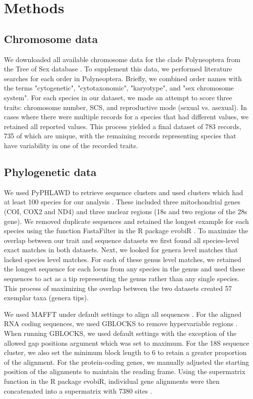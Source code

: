 \section{Methods}

\subsection{Chromosome data}
We downloaded all available chromosome data for the clade Polyneoptera from the Tree of Sex database \citep{blackmon2016,TOS2014}.
To supplement this data, we performed literature searches for each order in Polyneoptera.
Briefly, we combined order names with the terms "cytogenetic", "cytotaxonomic", "karyotype", and "sex chromosome system". %
For each species in our dataset, we made an attempt to score three traits: chromosome number, SCS, and reproductive mode (sexual vs. asexual).
In cases where there were multiple records for a species that had different values, we retained all reported values.
This process yielded a final dataset of 783 records, 735 of which are unique, with the remaining records representing species that have variability in one of the recorded traits. 

\subsection{Phylogenetic data}
We used PyPHLAWD to retrieve sequence clusters and used clusters which had at least 100 species for our analysis \citep{smith2018phyphlawd}. 
These included three mitochondrial genes (COI, COX2 and ND4) and three nuclear regions (18s and two regions of the 28s gene). 
We removed duplicate sequences and retained the longest example for each species using the function FastaFilter in the R package evobiR \citep{blackmon2015evobir}.
To maximize the overlap between our trait and sequence datasets we first found all species-level exact matches in both datasets.
Next, we looked for genera level matches that lacked species level matches.
For each of these genus level matches, we retained the longest sequence for each locus from any species in the genus and used these sequences to act as a tip representing the genus rather than any single species. 
This process of maximizing the overlap between the two datasets created 57 exemplar taxa (genera tips).

We used MAFFT under default settings to align all sequences \citep{katoh2013mafft}.
For the aligned RNA coding sequences, we used GBLOCKS to remove hypervariable regions \citep{castresana2000gblocks}. 
When running GBLOCKS, we used default settings with the exception of the allowed gap positions argument which was set to maximum. 
For the 18S sequence cluster, we also set the minimum block length to 6 to retain a greater proportion of the alignment. 
For the protein-coding genes, we manually adjusted the starting position of the alignments to maintain the reading frame. 
Using the supermatrix function in the R package evobiR, individual gene alignments were then concatenated into a supermatrix with 7380 sites \citep{blackmon2015evobir}.

